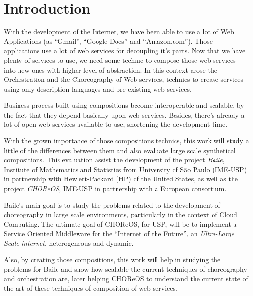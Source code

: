 \section{Introduction}

With the development of the Internet, we have been able to use a lot of Web Applications (as ``Gmail'', ``Google Docs'' and ``Amazon.com''). Those applications use a lot of web services for decoupling it's parts. Now that we have plenty of services to use, we need some technic to compose those web services into new ones with higher level of abstraction. In this context arose the Orchestration and the Choreography of Web services, technics to create services using only description languages and pre-existing web services.

Business process built using compositions become interoperable and scalable, by the fact that they depend basically upon web services. Besides, there's already a lot of open web services available to use, shortening the development time.

With the grown importance of those compositions technics, this work will study a little of the differences between them and also evaluate large scale synthetical compositions. This evaluation assist the development of the project \emph{Baile}, Institute of Mathematics and Statistics from University of São Paulo (IME-USP) in partnership with Hewlett-Packard (HP) of the United States, as well as the project \emph{CHOReOS}, IME-USP in partnership with a European consortium.

Baile’s main goal is to study the problems related to the development of choreography in large scale environments, particularly in the context of Cloud Computing. The ultimate goal of CHOReOS, for USP, will be to implement a Service Oriented Middleware for the ``Internet of the Future'', an \emph{Ultra-Large Scale internet}, heterogeneous and dynamic.

Also, by creating those compositions, this work will help in studying the problems for Baile and show how scalable the current techniques of choreography and orchestration are, later helping CHOReOS to understand the current state of the art of these techniques of composition of web services.